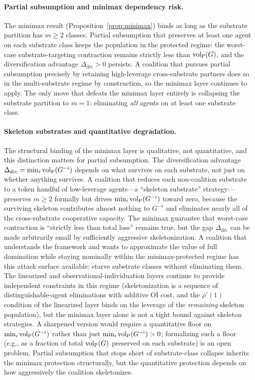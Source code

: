 \paragraph{Partial subsumption and minimax dependency risk.} The
minimax result (Proposition~\ref{prop:minimax}) binds as long as the
substrate partition has $m \geq 2$ classes. Partial subsumption that
preserves at least one agent on each substrate class keeps the
population in the protected regime: the worst-case substrate-targeting
contraction remains strictly less than ${\operatorname{vol}_{\mathrm{P}}}(G)$, and the
diversification advantage $\Delta_{\mathrm{div}} > 0$ persists. A
coalition that pursues partial subsumption precisely by retaining
high-leverage cross-substrate partners does so in the multi-substrate
regime by construction, so the minimax layer continues to apply. The
only move that defeats the minimax layer entirely is collapsing the
substrate partition to $m = 1$: eliminating \emph{all} agents on at
least one substrate class.

\paragraph{Skeleton substrates and quantitative degradation.} The
structural binding of the minimax layer is qualitative, not
quantitative, and this distinction matters for partial subsumption.
The diversification advantage
$\Delta_{\mathrm{div}} = \min_i {\operatorname{vol}_{\mathrm{P}}}(G^{-i})$ depends on what survives
on each substrate, not just on whether anything survives. A coalition
that reduces each non-coalition substrate to a token handful of
low-leverage agents---a ``skeleton substrate'' strategy---preserves
$m \geq 2$ formally but drives $\min_i {\operatorname{vol}_{\mathrm{P}}}(G^{-i})$ toward zero,
because the surviving skeleton contributes almost nothing to
$G^{-i}$ and eliminates nearly all of the cross-substrate cooperative
capacity. The minimax guarantee that worst-case contraction is
``strictly less than total loss'' remains true, but the gap
$\Delta_{\mathrm{div}}$ can be made arbitrarily small by sufficiently
aggressive skeletonization. A coalition that understands the
framework and wants to approximate the value of full domination while
staying nominally within the minimax-protected regime has this attack
surface available: starve substrate classes without eliminating them.
The linearized and observational-individuation layers continue to
provide independent constraints in this regime
(skeletonization is a sequence of distinguishable-agent eliminations
with additive OI cost, and the
$\rho'(1)$ condition of the linearized layer binds on the leverage
of the \emph{remaining} skeleton population), but the minimax layer
alone is not a tight bound against skeleton strategies. A sharpened
version would require a quantitative floor on $\min_i {\operatorname{vol}_{\mathrm{P}}}(G^{-i})$
rather than just $\min_i {\operatorname{vol}_{\mathrm{P}}}(G^{-i}) > 0$; formalizing such a floor
(e.g., as a fraction of total ${\operatorname{vol}_{\mathrm{P}}}(G)$ preserved on each substrate)
is an open problem. Partial subsumption that stops short of
substrate-class collapse inherits the minimax protection structurally,
but the quantitative protection depends on how aggressively the
coalition skeletonizes.

